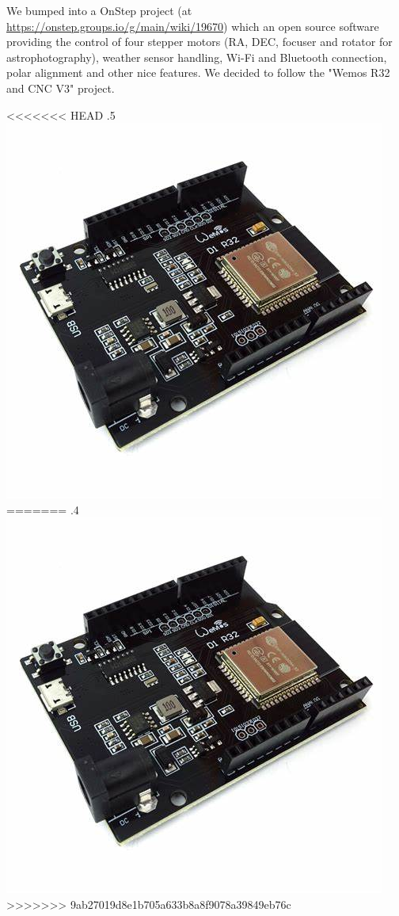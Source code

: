 \documentclass{article}
\begin{document}
\begin{multicols}{2}
        We bumped into a OnStep project (at \url{https://onstep.groups.io/g/main/wiki/19670}) which an open source software providing the control of four stepper motors (RA, DEC, focuser and rotator for astrophotography), weather sensor handling, Wi-Fi and Bluetooth connection, polar alignment and other nice features.
        We decided to follow the "Wemos R32 and CNC V3" project.
        
        \begin{minipage}
<<<<<<< HEAD
            {.5\textwidth}
            \centering
            \includegraphics[scale=0.25]{esp32_d1_r32.jpg}
=======
            {.4\textwidth}
            \includegraphics[scale=0.28]{esp32_d1_r32.jpg}
>>>>>>> 9ab27019d8e1b705a633b8a8f9078a39849eb76c
            \label{fig:esp32}
        \end{minipage}


\end{multicols}
\end{document}
